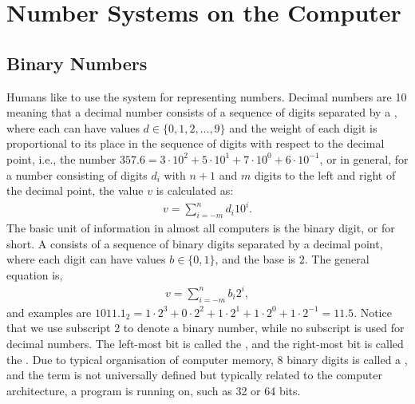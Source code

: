 \documentclass[fsharpnotes.tex]{subfiles}
\begin{document}
\chapter{Number Systems on the Computer}
\label{app:numbers}
\section{Binary Numbers}
\label{sec:binary}
Humans like to use the  system for representing numbers. Decimal numbers are  10 meaning that a decimal number consists of a sequence of digits separated by a , where each  can have values $d \in \{0,1,2,\ldots,9\}$ and the weight of each digit is proportional to its place in the sequence of digits with respect to the decimal point, i.e., the number $357.6=3\cdot 10^2+5\cdot 10^1+7\cdot 10^0+6\cdot 10^{-1}$, or in general, for a number consisting of digits $d_i$ with $n+1$ and $m$ digits to the left and right of the decimal point, the value $v$ is calculated as:
\begin{align}
  v = \sum_{i=-m}^nd_i10^i.
\end{align}
The basic unit of information in almost all computers is the binary digit, or  for short. A  consists of a sequence of binary digits separated by a decimal point, where each digit can have values $b \in \{0,1\}$, and the base is $2$. The general equation is,
\begin{align}
  v = \sum_{i=-m}^nb_i2^i,
\end{align}
and examples are $1011.1_2 = 1\cdot 2^3+0\cdot 2^2+1\cdot 2^1+1\cdot 2^0+1\cdot 2^{-1} = 11.5$. Notice that we use subscript 2 to denote a binary number, while no subscript is used for decimal numbers. The left-most bit is called the , and the right-most bit is called the . Due to typical organisation of computer memory, 8 binary digits is called a , and the term  is not universally defined but typically related to the computer architecture, a program is running on, such as 32 or 64 bits.
\end{document}
